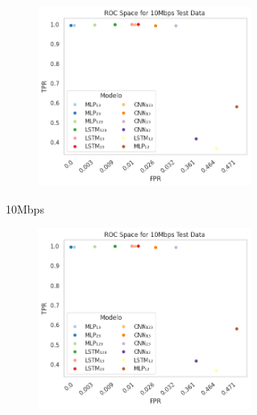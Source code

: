 \documentclass[a4paper,fleqn]{cas-sc}
\begin{document}
\begin{figure}
\begin{subcaptiongroup}
\begin{subfigure}[t]{.4\textwidth}
\begin{subcaptiongroup}
\begin{subfigure}[t]{0.3\textwidth}
				\end{subfigure}
			\begin{subfigure}[t]{0.3\textwidth}
				\includegraphics[width=\textwidth]{./figs/ROC-Space-Test-Data-10Mbps.png}
			\end{subfigure}
			\end{subcaptiongroup}
	\captionsetup{subrefformat=parens}
	\caption{10Mbps}
	\end{subfigure}%
	\begin{subfigure}[t]{.4\textwidth}
	\centering
	\begin{subcaptiongroup}
		\begin{subfigure}[t]{0.3\textwidth}
			\includegraphics[width=\textwidth]{./figs/ROC-Space-Test-Data-10Mbps.png}

\end{subfigure}
\end{subcaptiongroup}
\end{subfigure}
\end{subcaptiongroup}
\end{figure}
\end{document}
